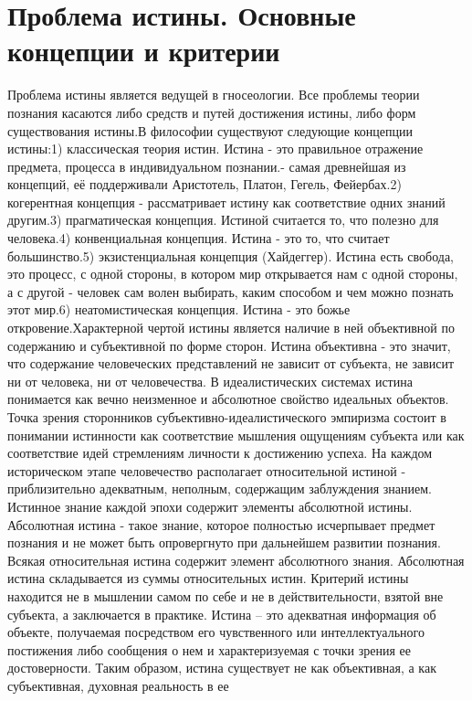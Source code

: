 \documentclass[12pt]{article}
\begin{document}
\section{Проблема истины. Основные концепции и критерии}
Проблема истины является ведущей в гносеологии. Все проблемы теории познания касаются либо средств и
путей достижения истины, либо форм существования истины.В философии существуют следующие концепции
истины:1) классическая теория истин. Истина - это правильное отражение предмета, процесса в
индивидуальном познании.- самая древнейшая из концепций, её поддерживали Аристотель, Платон, Гегель,
Фейербах.2) когерентная концепция - рассматривает истину как соответствие одних знаний другим.3)
прагматическая концепция. Истиной считается то, что полезно для человека.4) конвенциальная концепция.
Истина - это то, что считает большинство.5) экзистенциальная концепция (Хайдеггер). Истина есть свобода,
это процесс, с одной стороны, в котором мир открывается нам с одной стороны, а с другой - человек сам волен
выбирать, каким способом и чем можно познать этот мир.6) неатомистическая концепция. Истина - это божье 
откровение.Характерной чертой истины является наличие в ней объективной по содержанию и субъективной
по форме сторон.
Истина объективна - это значит, что содержание человеческих представлений не зависит от субъекта, не
зависит ни от человека, ни от человечества. В идеалистических системах истина понимается как вечно
неизменное и абсолютное свойство идеальных объектов. Точка зрения сторонников субъективно-идеалистического эмпиризма состоит в понимании истинности как соответствие мышления ощущениям
субъекта или как соответствие идей стремлениям личности к достижению успеха. На каждом историческом
этапе человечество располагает относительной истиной - приблизительно адекватным, неполным, содержащим
заблуждения знанием. Истинное знание каждой эпохи содержит элементы абсолютной истины. Абсолютная
истина - такое знание, которое полностью исчерпывает предмет познания и не может быть опровергнуто при
дальнейшем развитии познания. Всякая относительная истина содержит элемент абсолютного знания.
Абсолютная истина складывается из суммы относительных истин. Критерий истины находится не в мышлении
самом по себе и не в действительности, взятой вне субъекта, а заключается в практике.
Истина – это адекватная информация об объекте, получаемая посредством его чувственного или
интеллектуального постижения либо сообщения о нем и характеризуемая с точки зрения ее достоверности.
Таким образом, истина существует не как объективная, а как субъективная, духовная реальность в ее
\end{document}
